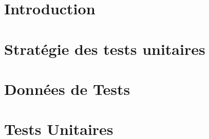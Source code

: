 \documentclass[asi]{picInsa}
\title{\PTU{}}
\author{\Michel} %
\begin{document}
\couverture{}

 \informationsGenerales{}


\tableofcontents

\setcounter{chapter}{0}

\chapter*{Introduction}
\label{introduction}


\chapter{Stratégie des tests unitaires}
\label{strategieDeTest}


\chapter{Données de Tests}
\label{donneesDeTests}


\chapter{Tests Unitaires}
\label{testsUnitaires}


\pageQuatriemeCouverture
\end{document}
